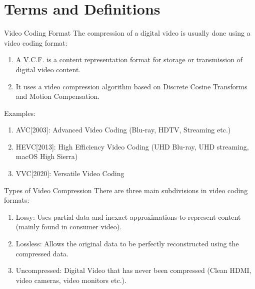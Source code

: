 \documentclass{beamer}
\begin{document}
\section{Terms and Definitions}
\begin{frame}{Video Coding Format}
The compression of a digital video is usually done using a video coding format: 
\begin{enumerate}[]
    \item A V.C.F. is a content representation format for storage or transmission of digital video content.
    \item It uses a video compression algorithm based on Discrete Cosine Transforms and Motion Compensation.%
\end{enumerate}
Examples: 
\begin{enumerate}[]
    \item AVC[2003]: Advanced Video Coding (Blu-ray, HDTV, Streaming etc.)
    \item HEVC[2013]: High Efficiency Video Coding (UHD Blu-ray, UHD streaming, macOS High Sierra)
    \item VVC[2020]: Versatile Video Coding
\end{enumerate}
\end{frame}
\begin{frame}{Types of Video Compression}
There are three main subdivisions in video coding formats:
\begin{enumerate}
    \item Lossy: Uses partial data and inexact approximations to represent content (mainly found in consumer video).
    \item Lossless: Allows the original data to be perfectly reconstructed using the compressed data.
    \item Uncompressed: Digital Video that has never been compressed (Clean HDMI, video cameras, video monitors etc.).
\end{enumerate}
    
\end{frame}
\end{document}
